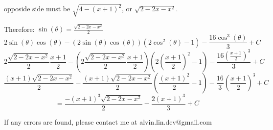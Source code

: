 \documentclass[letterpaper, 12pt]{math}
\begin{document}
opposide side must be \( \sqrt{4-(x+1)^{2}} \), or \( \sqrt{2-2x-x^{2}} \).
\begin{center}
\end{center}
Therefore: \( \sin(\theta) = \frac{\sqrt{2-2x-x^{2}}}{2} \)
\[ 2\sin(\theta)\cos(\theta)-
   (2\sin(\theta)\cos(\theta))(2\cos^{2}(\theta)-1)-
   \frac{16\cos^{3}(\theta)}{3}+C \]
\[ 2\frac{\sqrt{2-2x-x^{2}}}{2}\frac{x+1}{2}-
   (2\frac{\sqrt{2-2x-x^{2}}}{2}\frac{x+1}{2})(2(\frac{x+1}{2})^{2}-1)-
   \frac{16(\frac{x+1}{2})^{3}}{3}+C \]
\[ \frac{(x+1)\sqrt{2-2x-x^{2}}}{2}-
   \frac{(x+1)\sqrt{2-2x-x^{2}}}{2}(\frac{(x+1)^{2}}{2}-1)-
   \frac{16}{3}(\frac{x+1}{2})^{3}+C \]
\[ = \frac{-(x+1)^{3}\sqrt{2-2x-x^{2}}}{2}-\frac{2(x+1)^{3}}{3}+C \]

\begin{center}
  If any errors are found, please contact me at alvin.lin.dev@gmail.com
\end{center}
\end{document}
